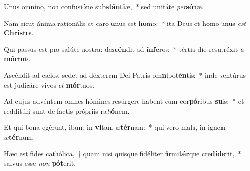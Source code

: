 \item Unus omníno, non confusi\textbf{ó}ne sub\textbf{stán}\textbf{ti}æ,~* sed unitáte \textit{per}\textbf{só}næ.
\item Nam sicut ánima rationális et caro \textbf{u}nus est \textbf{ho}mo:~* ita Deus et homo unus \textit{est} \textbf{Chris}tus.
\item Qui passus est pro salúte nostra: de\textbf{scén}dit ad \textbf{ín}\textbf{fe}ros:~* tértia die resurréxit \textit{a} \textbf{mór}tuis.
\item Ascéndit ad cælos, sedet ad déxteram Dei Patris om\textbf{ni}pot\textbf{én}tis:~* inde ventúrus est judicáre vivos \textit{et} \textbf{mór}tuos.
\item Ad cujus advéntum omnes hómines resúrgere habent cum cor\textbf{pó}ribus \textbf{su}is;~* et redditúri sunt de factis própriis ra\textit{ti}\textbf{ó}nem.
\item Et qui bona egérunt, ibunt in \textbf{vi}tam æ\textbf{tér}nam:~* qui vero mala, in ignem \textit{æ}\textbf{tér}num.
\item Hæc est fides cathólica,~† quam nisi quisque fidéliter firmi\textbf{tér}que cre\textbf{dí}\textbf{de}rit,~* salvus esse \textit{non} \textbf{pót}erit.
